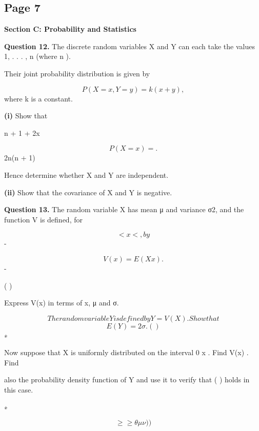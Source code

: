 \documentclass[12pt]{article}
\begin{document}
\subsection*{Page 7}
\begin{flushleft}
\bigskip\textbf{Section C: Probability and Statistics}\par
\bigskip\textbf{Question 12.} The discrete random variables X and Y can each take the values 1, . . . , n (where n ).\par
Their joint probability distribution is given by\par
\[P(X = x, Y = y) = k(x + y) ,\]
where k is a constant.\par
\textbf{(i)} Show that\par
n + 1 + 2x\par
\[P(X = x) = .\]
2n(n + 1)\par
Hence determine whether X and Y are independent.\par
\textbf{(ii)} Show that the covariance of X and Y is negative.\par
\bigskip\textbf{Question 13.} The random variable X has mean μ and variance σ2, and the function V is defined, for\par
\[< x < , by\]
-\infty {}\par
\[V(x) = E (X x) .\]
-\par
( )\par
Express V(x) in terms of x, μ and σ.\par
\[The random variable Y is defined by Y = V(X). Show that\]
\[E(Y ) = 2σ . ( )\]
∗\par
Now suppose that X is uniformly distributed on the interval 0 \geq x  . Find V(x) . Find\par
also the probability density function of Y and use it to verify that ( ) holds in this case.\par
∗\par
\[\geq\geq\theta\mu\nu) )\]
\end{flushleft}
\end{document}
